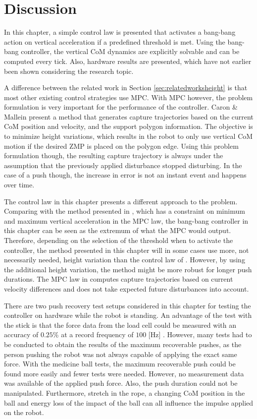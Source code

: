 \section{Discussion}
In this chapter, a simple control law is presented that activates a bang-bang action on vertical acceleration if a predefined threshold is met. Using the bang-bang controller, the vertical \ac{CoM} dynamics are explicitly solvable and can be computed every tick. Also, hardware results are presented, which have not earlier been shown considering the research topic. 

A difference between the related work in Section \ref{sec:relatedworksheight} is that most other existing control strategies use \ac{MPC}. With \ac{MPC} however, the problem formulation is very important for the performance of the controller. Caron \& Mallein \cite{caron2018balance} present a method that generates capture trajectories based on the current \ac{CoM} position and velocity, and the support polygon information. The objective is to minimize height variations, which results in the robot to only use vertical \ac{CoM} motion if the desired \ac{ZMP} is placed on the polygon edge. Using this problem formulation though, the resulting capture trajectory is always under the assumption that the previously applied disturbance stopped disturbing. In the case of a push though, the increase in error is not an instant event and happens over time.

The control law in this chapter presents a different approach to the problem. Comparing with the method presented in \cite{caron2018balance}, which has a constraint on minimum and maximum vertical acceleration in the \ac{MPC} law, the bang-bang controller in this chapter can be seen as the extremum of what the \ac{MPC} would output. Therefore, depending on the selection of the threshold when to activate the controller, the method presented in this chapter will in some cases use more, not necessarily needed, height variation than the control law of \cite{caron2018balance}. However, by using the additional height variation, the method might be more robust for longer push durations. The \ac{MPC} law in \cite{caron2018balance} computes capture trajectories based on current velocity differences and does not take expected future disturbances into account.

There are two push recovery test setups considered in this chapter for testing the controller on hardware while the robot is standing. An advantage of the test with the stick is that the force data from the load cell could be measured with an accuracy of $0.25$\% at a record frequency of $100$ [Hz] \cite{iload}. However, many tests had to be conducted to obtain the results of the maximum recoverable pushes, as the person pushing the robot was not always capable of applying the exact same force. With the medicine ball tests, the maximum recoverable push could be found more easily and fewer tests were needed. However, no measurement data was available of the applied push force. Also, the push duration could not be manipulated. Furthermore, stretch in the rope, a changing \ac{CoM} position in the ball and energy loss of the impact of the ball can all influence the impulse applied on the robot.

